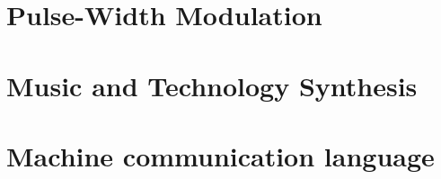 \documentclass[a4paper,twoside]{book}
\begin{document}






\chapter{Pulse-Width Modulation}
\label{chapter:pwm}






\chapter{Music and Technology Synthesis}
\label{chapter:music-and-technology-synthesis}


















\chapter{Machine communication language}
\label{chapter:computer-language}




\end{document}
